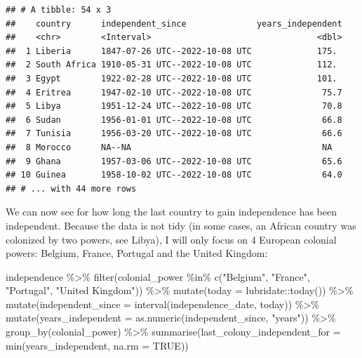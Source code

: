 \documentclass[
]{article}
\newenvironment{Shaded}{\begin{snugshade}}{\end{snugshade}}
\newcommand{\AttributeTok}[1]{\textcolor[rgb]{0.77,0.63,0.00}{#1}}
\newcommand{\ConstantTok}[1]{\textcolor[rgb]{0.00,0.00,0.00}{#1}}
\newcommand{\FunctionTok}[1]{\textcolor[rgb]{0.00,0.00,0.00}{#1}}
\newcommand{\NormalTok}[1]{#1}
\newcommand{\SpecialCharTok}[1]{\textcolor[rgb]{0.00,0.00,0.00}{#1}}
\newcommand{\StringTok}[1]{\textcolor[rgb]{0.31,0.60,0.02}{#1}}
\begin{document}
\begin{verbatim}
## # A tibble: 54 x 3
##    country      independent_since              years_independent
##    <chr>        <Interval>                                 <dbl>
##  1 Liberia      1847-07-26 UTC--2022-10-08 UTC             175. 
##  2 South Africa 1910-05-31 UTC--2022-10-08 UTC             112. 
##  3 Egypt        1922-02-28 UTC--2022-10-08 UTC             101. 
##  4 Eritrea      1947-02-10 UTC--2022-10-08 UTC              75.7
##  5 Libya        1951-12-24 UTC--2022-10-08 UTC              70.8
##  6 Sudan        1956-01-01 UTC--2022-10-08 UTC              66.8
##  7 Tunisia      1956-03-20 UTC--2022-10-08 UTC              66.6
##  8 Morocco      NA--NA                                      NA  
##  9 Ghana        1957-03-06 UTC--2022-10-08 UTC              65.6
## 10 Guinea       1958-10-02 UTC--2022-10-08 UTC              64.0
## # ... with 44 more rows
\end{verbatim}

We can now see for how long the last country to gain independence has been independent.
Because the data is not tidy (in some cases, an African country was colonized by two powers,
see Libya), I will only focus on 4 European colonial powers: Belgium, France, Portugal and the United Kingdom:

\begin{Shaded}
\begin{Highlighting}[]
\NormalTok{independence }\SpecialCharTok{\%\textgreater{}\%}
  \FunctionTok{filter}\NormalTok{(colonial\_power }\SpecialCharTok{\%in\%} \FunctionTok{c}\NormalTok{(}\StringTok{"Belgium"}\NormalTok{, }\StringTok{"France"}\NormalTok{, }\StringTok{"Portugal"}\NormalTok{, }\StringTok{"United Kingdom"}\NormalTok{)) }\SpecialCharTok{\%\textgreater{}\%}
  \FunctionTok{mutate}\NormalTok{(}\AttributeTok{today =}\NormalTok{ lubridate}\SpecialCharTok{::}\FunctionTok{today}\NormalTok{()) }\SpecialCharTok{\%\textgreater{}\%}
  \FunctionTok{mutate}\NormalTok{(}\AttributeTok{independent\_since =} \FunctionTok{interval}\NormalTok{(independence\_date, today)) }\SpecialCharTok{\%\textgreater{}\%}
  \FunctionTok{mutate}\NormalTok{(}\AttributeTok{years\_independent =} \FunctionTok{as.numeric}\NormalTok{(independent\_since, }\StringTok{"years"}\NormalTok{)) }\SpecialCharTok{\%\textgreater{}\%}
  \FunctionTok{group\_by}\NormalTok{(colonial\_power) }\SpecialCharTok{\%\textgreater{}\%}
  \FunctionTok{summarise}\NormalTok{(}\AttributeTok{last\_colony\_independent\_for =} \FunctionTok{min}\NormalTok{(years\_independent, }\AttributeTok{na.rm =} \ConstantTok{TRUE}\NormalTok{))}
\end{Highlighting}
\end{Shaded}
\end{document}
